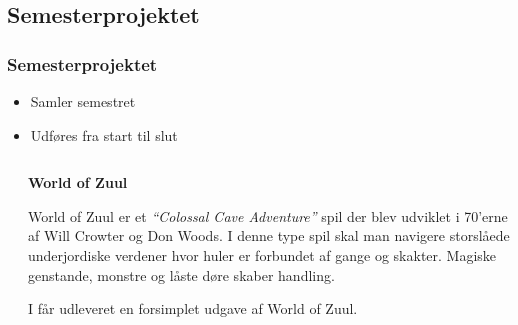 \documentclass[t, aspectratio=169]{beamer}
\newcommand{\quoted}[1]{\textsl{``#1''}}
\begin{document}
\subsection{Semesterprojektet}
\begin{frame}[fragile]
  \frametitle{Semesterprojektet}
  \vspace{1mm}
  
  \begin{itemize}
    \item Samler semestret
    \item Udføres fra start til slut
  \end{itemize}
  
  \begin{columns}
    \begin{column}{0.6\textwidth}
    \end{column}
    \begin{column}{0.45\textwidth}
      \textbf{World of Zuul}
      
      \vspace{3mm}
      World of Zuul er et \quoted{Colossal Cave Adventure} spil der blev udviklet i 70'erne af Will Crowter og Don Woods. I denne type spil skal man navigere storslåede underjordiske verdener hvor huler er forbundet af gange og skakter. Magiske genstande, monstre og låste døre skaber handling.
      
      \vspace{3mm}
      I får udleveret en forsimplet udgave af World of Zuul.
    \end{column}
  \end{columns}
  
\end{frame}
\end{document}
